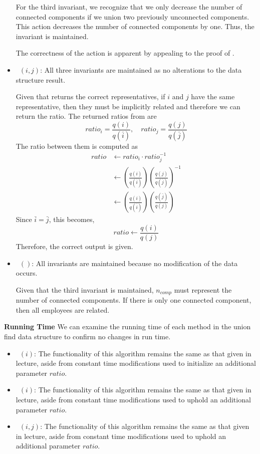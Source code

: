 \documentclass[12pt,twoside]{article}
\begin{document}
\begin{problems}
\begin{itemize}
        For the third invariant, we recognize that we only decrease the number of
        connected components if we union two previously unconnected components.
        This action decreases the number of connected components by one. Thus, the
        invariant is maintained.
        
        The correctness of the action is apparent by appealing to the proof of 
        .
    \item\ $(i, j)$: All three invariants are maintained as no
        alterations to the data structure result.
        
        Given that  returns the correct representatives, if $i$ and
        $j$ have the same representative, then they must be implicitly related and 
        therefore we can return the ratio. The returned ratios from 
        are
        $$ ratio_i = \frac{q(i)}{q(\bar{i})},\quad ratio_j = \frac{q(j)}{q(\bar{j})} $$
        The ratio between them is computed as
        \begin{align*}
            ratio &\leftarrow ratio_i \cdot ratio_j^{-1} \\
            &\leftarrow \left(\frac{q(i)}{q(\bar{i})}\right)
            \left(\frac{q(j)}{q(\bar{j})}\right)^{-1} \\
            &\leftarrow \left(\frac{q(i)}{q(\bar{i})}\right)
            \left(\frac{q(\bar{j})}{q(j)}\right)
        \end{align*}
        Since $\bar{i} = \bar{j}$, this becomes,
        $$ ratio \leftarrow \frac{q(i)}{q(j)} $$
        Therefore, the correct output is given.
    \item\ $()$: All invariants are maintained because no 
        modification of the data occurs.
        
        Given that the third invariant is maintained,  $n_{comp}$ must 
        represent the number of connected components. If there is only one 
        connected component, then all employees are related.
\end{itemize}

\textbf{Running Time} We can examine the running time of each method in the 
union find data structure to confirm no changes in run time.

\begin{itemize}
    \item\ $(i)$: The functionality of this algorithm remains
        the same as that given in lecture, aside from constant time modifications
        used to initialize an additional parameter $ratio$.
    \item\ $(i)$: The functionality of this algorithm remains
        the same as that given in lecture, aside from constant time modifications
        used to uphold an additional parameter $ratio$.
    \item\ $(i, j)$: The functionality of this algorithm remains
        the same as that given in lecture, aside from constant time modifications
        used to uphold an additional parameter $ratio$.
\end{itemize}


\end{problems}
\end{document}
